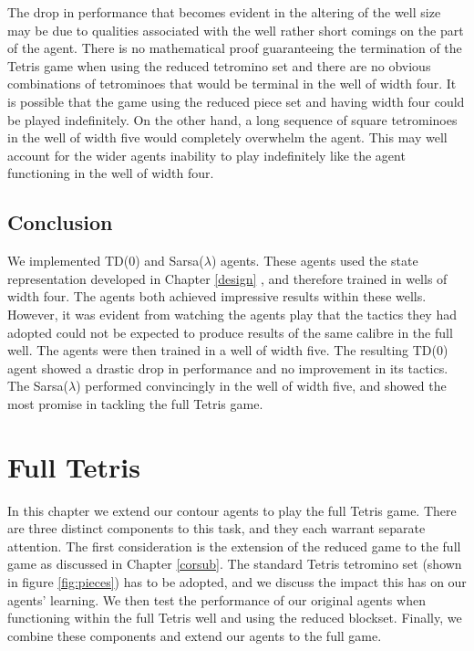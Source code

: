 \documentclass{rucsthesis}
\begin{document}
The drop in performance that becomes evident in the altering of the well size may be due to qualities associated with the well rather short comings on the part of the agent. There is no mathematical proof guaranteeing the termination of the Tetris game when using the reduced tetromino set and there are no obvious combinations of tetrominoes that would be terminal in the well of width four. It is possible that the game using the reduced piece set and having width four could be played indefinitely. On the other hand, a long sequence of square tetrominoes in the well of width five would completely overwhelm the agent. This may well account for the wider agents inability to play indefinitely like the agent functioning in the well of width four.

\section{Conclusion}

We implemented TD(0) and Sarsa($\lambda$) agents. These agents used the state representation developed in Chapter \ref{design} , and therefore trained in wells of width four. The agents both achieved impressive results within these wells. However, it was evident from watching the agents play that the tactics they had adopted could not be expected to produce results of the same calibre in the full well. The agents were then trained in a well of width five. The resulting TD(0) agent showed a drastic drop in performance and no improvement in its tactics. The Sarsa($\lambda$) performed convincingly in the well of width five, and showed the most promise in tackling the full Tetris game. 

\chapter{Full Tetris}

In this chapter we extend our contour agents to play the full Tetris game. There are three distinct components to this task, and they each warrant separate attention. The first consideration is the extension of the reduced game to the full game as discussed in Chapter \ref{corsub}. The standard Tetris tetromino set (shown in figure \ref{fig:pieces}) has to be adopted, and we discuss the impact this has on our agents' learning. We then test the performance of our original agents when functioning within the full Tetris well and using the reduced blockset. Finally, we combine these components and extend our agents to the full game.
\end{document}
